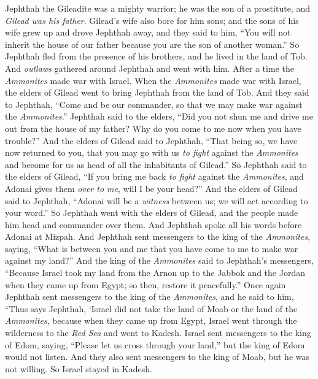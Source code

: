 \begin{biblechapter} %
 Jephthah the Gileadite was a mighty warrior; he was the son of a prostitute, and \textit{Gilead was his father}.
\verse Gilead’s wife also bore for him sons; and the sons of his wife grew up and drove Jephthah away, and they said to him, “You will not inherit the house of our father because you are the son of another woman.”
\verse So Jephthah fled from the presence of his brothers, and he lived in the land of Tob. And \textit{outlaws} gathered around Jephthah and went with him.
\verse After a time the \textit{Ammonites} made war with Israel.
\verse When the \textit{Ammonites} made war with Israel, the elders of Gilead went to bring Jephthah from the land of Tob.
\verse And they said to Jephthah, “Come and be our commander, so that we may make war against the \textit{Ammonites}.”
\verse Jephthah said to the elders, “Did you not shun me and drive me out from the house of my father? Why do you come to me now when you have trouble?”
\verse And the elders of Gilead said to Jephthah, “That being so, we have now returned to you, that you may go with us \textit{to fight} against the \textit{Ammonites} and become for us as head of all the inhabitants of Gilead.”
\verse So Jephthah said to the elders of Gilead, “If you bring me back \textit{to fight} against the \textit{Ammonites}, and Adonai gives them \textit{over to me}, will I be your head?”
\verse And the elders of Gilead said to Jephthah, “Adonai will be a \textit{witness} between us; we will act according to your word.”
\verse So Jephthah went with the elders of Gilead, and the people made him head and commander over them. And Jephthah spoke all his words before Adonai at Mizpah.
\verse And Jephthah sent messengers to the king of the \textit{Ammonites}, saying, “What is between you and me that you have come to me to make war against my land?”
\verse And the king of the \textit{Ammonites} said to Jephthah’s messengers, “Because Israel took my land from the Arnon up to the Jabbok and the Jordan when they came up from Egypt; so then, restore it peacefully.”
\verse Once again Jephthah sent messengers to the king of the \textit{Ammonites},
\verse and he said to him, “Thus says Jephthah, ‘Israel did not take the land of Moab or the land of the \textit{Ammonites},
\verse because when they came up from Egypt, Israel went through the wilderness to the \textit{Red Sea} and went to Kadesh.
\verse Israel sent messengers to the king of Edom, saying, “Please let us cross through your land,” but the king of Edom would not listen. And they also sent messengers to the king of Moab, but he was not willing. So Israel stayed in Kadesh.

\end{biblechapter}
